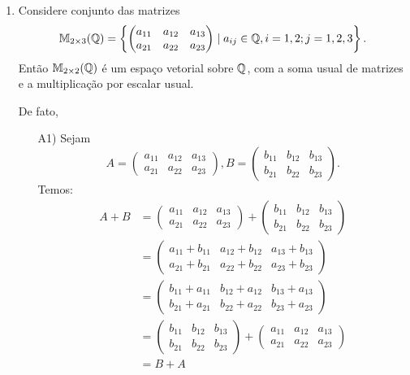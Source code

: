 \begin{exemplo}
\begin{enumerate}[label={\arabic*})]
    \item Considere conjunto das matrizes
          \[
            \mathbb{M}_{2 \times 3}(\mathbb{Q}) = \left\{\begin{pmatrix}a_{11} & a_{12} & a_{13}\\a_{21} & a_{22} & a_{23}\end{pmatrix} \mid a_{ij} \in \mathbb{Q}, i = 1, 2; j = 1, 2, 3\right\}.
          \]
          Então $\mathbb{M}_{2\times 2}(\mathbb{Q})$ é um espa\c{c}o vetorial sobre $\mathbb{Q}$, com a soma usual de matrizes e a multiplica\c{c}\~ao por escalar usual.
          \begin{solucao}
            De fato,
            \begin{itemize}
              \item[A1)] Sejam
                \[
                  A = \begin{pmatrix} a_{11} & a_{12} & a_{13}\\a_{21} & a_{22} & a_{23}\end{pmatrix},
                  B = \begin{pmatrix} b_{11} & b_{12} & b_{13}\\b_{21} & b_{22} & b_{23}\end{pmatrix}.
                \]
                Temos:
                \begin{align*}
                  A + B & = \begin{pmatrix} a_{11} & a_{12} & a_{13}\\a_{21} & a_{22} & a_{23}\end{pmatrix} + \begin{pmatrix} b_{11} & b_{12} & b_{13}\\b_{21} & b_{22} & b_{23}\end{pmatrix}
                  \\ &= \begin{pmatrix} a_{11} + b_{11} & a_{12} + b_{12} & a_{13} + b_{13}\\a_{21} + b_{21} & a_{22} + b_{22} & a_{23} + b_{23}\end{pmatrix}
                  \\ &= \begin{pmatrix} b_{11} + a_{11} & b_{12} + a_{12} & b_{13} + a_{13}\\b_{21} + a_{21} & b_{22} + a_{22} & b_{23} + a_{23}\end{pmatrix}
                  \\ &= \begin{pmatrix} b_{11} & b_{12} & b_{13}\\b_{21} & b_{22} & b_{23}\end{pmatrix} + \begin{pmatrix} a_{11} & a_{12} & a_{13}\\a_{21} & a_{22} & a_{23}\end{pmatrix}
                  \\ &= B + A
                \end{align*}


\end{itemize}
\end{solucao}
\end{enumerate}
\end{exemplo}
